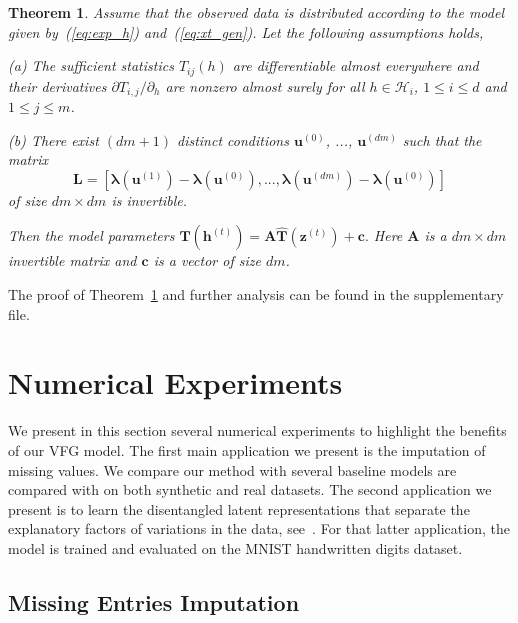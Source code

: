 \documentclass[twoside]{article}
\newtheorem{theorem}{Theorem}
\begin{document}
\begin{theorem}\label{thm:identif}
Assume that the observed data is distributed according to the model given by~(\ref{eq:exp_h}) and~(\ref{eq:xt_gen}).
Let the following assumptions holds,

\vspace{0.05in}
(a) The sufficient statistics $T_{ij}(h)$ are differentiable almost everywhere and their derivatives $ \partial T_{i,j}/\partial_h$ are nonzero almost surely for all $h\in \mathcal{H}_i$, $1\leq i \leq d$ and $1 \leq j  \leq m$.

\vspace{0.05in}
(b) There exist $(dm+1)$ distinct conditions $\mathbf{u}^{(0)}$, ..., $\mathbf{u}^{(dm)}$  such that the matrix 
\begin{equation*} 
\mathbf{L} = [\mathbf{\lambda}(\mathbf{u}^{(1)}) - \mathbf{\lambda}(\mathbf{u}^{(0)}), ..., \mathbf{\lambda}(\mathbf{u}^{(dm)}) - \mathbf{\lambda}(\mathbf{u}^{(0)}) ]
\end{equation*} 
of size $dm \times dm$ is invertible.

Then the model parameters 
$\mathbf{T}(\mathbf{h}^{(t)}) = \mathbf{A}\widehat{\mathbf{T}}(\mathbf{z}^{(t)}) + \mathbf{c}.$ Here $\mathbf{A}$ is a $dm \times dm$ invertible matrix and $\mathbf{c}$ is a vector of size $dm$.
\end{theorem}
The proof of Theorem~\ref{thm:identif} and further analysis can be found in the supplementary file. 

\section{Numerical Experiments}\label{sec:numerical}


We present in this section several numerical experiments to highlight the benefits of our VFG model.
The first main application we present is the imputation of missing values. We compare our method with several baseline models are compared with on both synthetic and real datasets.
The second application we present is to learn the disentangled latent representations that separate the explanatory factors of variations in the data, see~\cite{bengio2013representation}.
For that latter application, the model is trained and evaluated on the MNIST handwritten digits dataset.


\subsection{Missing Entries Imputation}
\end{document}

